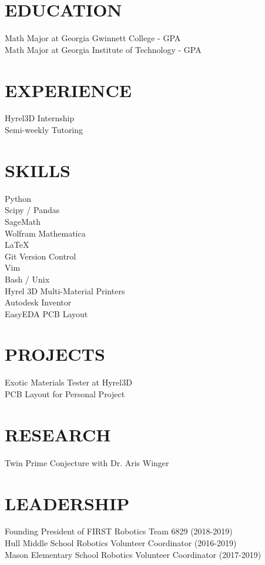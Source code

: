 \documentclass[margin, 10pt]{./res} %
\begin{document}
\begin{resume}

\section{EDUCATION}  
Math Major at Georgia Gwinnett College \quad -  GPA\\
Math Major at Georgia Institute of Technology \quad -  GPA
%
\section{EXPERIENCE}  
Hyrel3D Internship\\
Semi-weekly Tutoring

%
\section{SKILLS}  
Python\\
Scipy / Pandas\\
SageMath\\
Wolfram Mathematica\\
\LaTeX\\
Git Version Control\\
Vim\\
Bash / Unix\\
Hyrel 3D Multi-Material Printers\\
Autodesk Inventor\\
EasyEDA PCB Layout
%
\section{PROJECTS} 
Exotic Materials Tester at Hyrel3D\\
PCB Layout for Personal Project\\
% 
\section{RESEARCH} 

Twin Prime Conjecture with Dr. Aris Winger
%
\section{LEADERSHIP} 
Founding President of FIRST Robotics Team 6829 (2018-2019)\\
Hull Middle School Robotics Volunteer Coordinator (2016-2019)\\
Mason Elementary School Robotics Volunteer Coordinator (2017-2019)
%
\end{resume}
\end{document}
